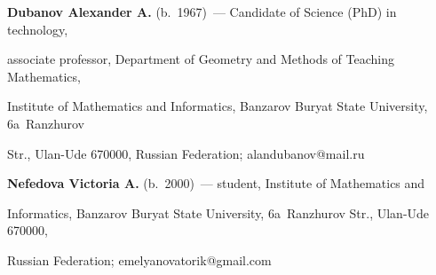 \Contr








\noindent


\textbf{Dubanov Alexander A.} (b.\ 1967)~--- Candidate of Science (PhD) in technology, 


associate professor, Department of Geometry and Methods of Teaching Mathematics, 


Institute of Mathematics and Informatics, Banzarov Buryat State University, 6a~Ranzhurov 


Str., Ulan-Ude 670000, Russian Federation; \mbox{alandubanov@mail.ru}





\vspace*{3pt}





\noindent


\textbf{Nefedova Victoria A.} (b.\ 2000)~--- student, Institute of Mathematics and 


Informatics, Banzarov Buryat State University, 6a~Ranzhurov Str., Ulan-Ude 670000, 


Russian Federation; \mbox{emelyanovatorik@gmail.com}











\label{end\stat}





\renewcommand{\bibname}{\protect\rm Литература}    


